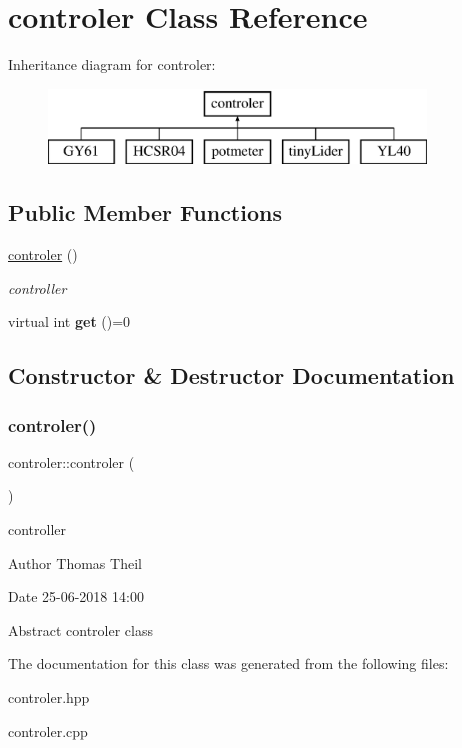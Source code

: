 \hypertarget{classcontroler}{}\section{controler Class Reference}
\label{classcontroler}
Inheritance diagram for controler\+:\begin{figure}[H]
\begin{center}
\leavevmode
\includegraphics[height=2.000000cm]{classcontroler}
\end{center}
\end{figure}
\subsection*{Public Member Functions}
\begin{DoxyCompactItemize}
\item 
\mbox{\hyperlink{classcontroler_a9c52c62aa5a072b7853d711f3337f11b}{controler}} ()
\begin{DoxyCompactList}\small\item\em controller \end{DoxyCompactList}\item 
\mbox{\label{classcontroler_a3c8e3c641d371c50a53780d104a3c016}} 
virtual int {\bfseries get} ()=0
\end{DoxyCompactItemize}


\subsection{Constructor \& Destructor Documentation}
\mbox{\label{classcontroler_a9c52c62aa5a072b7853d711f3337f11b}} 
\subsubsection{\texorpdfstring{controler()}{controler()}}
{\footnotesize\ttfamily controler\+::controler (\begin{DoxyParamCaption}{ }\end{DoxyParamCaption})}



controller 

\begin{DoxyAuthor}{Author}
Thomas Theil 
\end{DoxyAuthor}
\begin{DoxyDate}{Date}
25-\/06-\/2018 14\+:00
\end{DoxyDate}
Abstract controler class 

The documentation for this class was generated from the following files\+:\begin{DoxyCompactItemize}
\item 
controler.\+hpp\item 
controler.\+cpp\end{DoxyCompactItemize}
